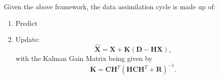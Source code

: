Given the above framework, the data assimilation cycle is made up of:
\begin{enumerate}
    \item Predict
    \item Update:
    \begin{equation}
        \hat{\mathbf{X}} = \mathbf{X} + \mathbf{K}
                           \left(
                           \mathbf{D} - \mathbf{H} \mathbf{X}
                           \right),
    \end{equation}
    with the Kalman Gain Matrix being given by
    \begin{equation}
        \mathbf{K} = \mathbf{C} \mathbf{H}^T
                     {\left(
                     \mathbf{H} \mathbf{C} \mathbf{H}^T
                     + \mathbf{R}
                     \right)} ^ {-1}.
    \end{equation}
\end{enumerate}




